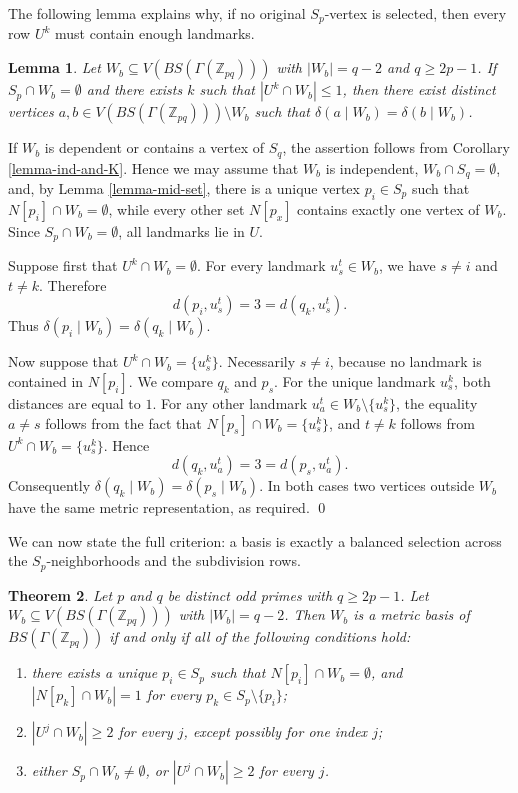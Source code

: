 \documentclass[12pt]{article}
\renewenvironment{proof}{{\bf \noindent Proof.}}{\qed}
\newtheorem{theorem}{Theorem}[section]
\newtheorem{lemma}[theorem]{Lemma}
\begin{document}
\medskip
\noindent The following lemma explains why, if no original $S_p$-vertex is selected, then every row $U^k$ must contain enough landmarks.
\begin{lemma}\label{lemma-sp-empty-row}
Let $W_b\subseteq V(BS(\Gamma(\mathbb Z_{pq})))$ with $|W_b|=q-2$ and $q\geq 2p-1$. If $S_p\cap W_b=\emptyset$ and there exists $k$ such that $|U^k\cap W_b|\leq 1$, then there exist distinct vertices $a,b\in V(BS(\Gamma(\mathbb Z_{pq})))\setminus W_b$ such that $\delta(a\mid W_b)=\delta(b\mid W_b)$.
\end{lemma}

\begin{proof}
If $W_b$ is dependent or contains a vertex of $S_q$, the assertion follows from Corollary \ref{lemma-ind-and-K}. Hence we may assume that $W_b$ is independent, $W_b\cap S_q=\emptyset$, and, by Lemma \ref{lemma-mid-set}, there is a unique vertex $p_i\in S_p$ such that $N[p_i]\cap W_b=\emptyset$, while every other set $N[p_x]$ contains exactly one vertex of $W_b$. Since $S_p\cap W_b=\emptyset$, all landmarks lie in $U$.

Suppose first that $U^k\cap W_b=\emptyset$. For every landmark $u_s^t\in W_b$, we have $s\neq i$ and $t\neq k$. Therefore
$$
d(p_i,u_s^t)=3=d(q_k,u_s^t).
$$
Thus $\delta(p_i\mid W_b)=\delta(q_k\mid W_b)$.

Now suppose that $U^k\cap W_b=\{u_s^k\}$. Necessarily $s\neq i$, because no landmark is contained in $N[p_i]$. We compare $q_k$ and $p_s$. For the unique landmark $u_s^k$, both distances are equal to $1$. For any other landmark $u_a^t\in W_b\setminus\{u_s^k\}$, the equality $a\neq s$ follows from the fact that $N[p_s]\cap W_b=\{u_s^k\}$, and $t\neq k$ follows from $U^k\cap W_b=\{u_s^k\}$. Hence
$$
d(q_k,u_a^t)=3=d(p_s,u_a^t).
$$
Consequently $\delta(q_k\mid W_b)=\delta(p_s\mid W_b)$. In both cases two vertices outside $W_b$ have the same metric representation, as required.
\end{proof}

\medskip
\noindent We can now state the full criterion: a basis is exactly a balanced selection across the $S_p$-neighborhoods and the subdivision rows.
\begin{theorem}\label{thm-barycentric-basis}
Let $p$ and $q$ be distinct odd primes with $q\geq 2p-1$. Let $W_b\subseteq V(BS(\Gamma(\mathbb Z_{pq})))$ with $|W_b|=q-2$. Then $W_b$ is a metric basis of $BS(\Gamma(\mathbb Z_{pq}))$ if and only if all of the following conditions hold:
\begin{enumerate}[label=$\mathrm{(\arabic*)}$]
\item there exists a unique $p_i\in S_p$ such that $N[p_i]\cap W_b=\emptyset$, and $|N[p_k]\cap W_b|=1$ for every $p_k\in S_p\setminus\{p_i\}$;
\item $|U^j\cap W_b|\geq 2$ for every $j$, except possibly for one index $j$;
\item either $S_p\cap W_b\neq\emptyset$, or $|U^j\cap W_b|\geq 2$ for every $j$.
\end{enumerate}
\end{theorem}
\end{document}

